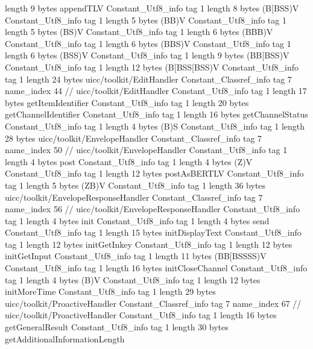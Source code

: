 {{{			length	9
			bytes	appendTLV
		}
		Constant_Utf8_info {
			tag	1
			length	8
			bytes	(B[BSS)V
		}
		Constant_Utf8_info {
			tag	1
			length	5
			bytes	(BB)V
		}
		Constant_Utf8_info {
			tag	1
			length	5
			bytes	(BS)V
		}
		Constant_Utf8_info {
			tag	1
			length	6
			bytes	(BBB)V
		}
		Constant_Utf8_info {
			tag	1
			length	6
			bytes	(BBS)V
		}
		Constant_Utf8_info {
			tag	1
			length	6
			bytes	(BSS)V
		}
		Constant_Utf8_info {
			tag	1
			length	9
			bytes	(BB[BSS)V
		}
		Constant_Utf8_info {
			tag	1
			length	12
			bytes	(B[BSS[BSS)V
		}
		Constant_Utf8_info {
			tag	1
			length	24
			bytes	uicc/toolkit/EditHandler
		}
		Constant_Classref_info {
			tag	7
			name_index	44		// uicc/toolkit/EditHandler
		}
		Constant_Utf8_info {
			tag	1
			length	17
			bytes	getItemIdentifier
		}
		Constant_Utf8_info {
			tag	1
			length	20
			bytes	getChannelIdentifier
		}
		Constant_Utf8_info {
			tag	1
			length	16
			bytes	getChannelStatus
		}
		Constant_Utf8_info {
			tag	1
			length	4
			bytes	(B)S
		}
		Constant_Utf8_info {
			tag	1
			length	28
			bytes	uicc/toolkit/EnvelopeHandler
		}
		Constant_Classref_info {
			tag	7
			name_index	50		// uicc/toolkit/EnvelopeHandler
		}
		Constant_Utf8_info {
			tag	1
			length	4
			bytes	post
		}
		Constant_Utf8_info {
			tag	1
			length	4
			bytes	(Z)V
		}
		Constant_Utf8_info {
			tag	1
			length	12
			bytes	postAsBERTLV
		}
		Constant_Utf8_info {
			tag	1
			length	5
			bytes	(ZB)V
		}
		Constant_Utf8_info {
			tag	1
			length	36
			bytes	uicc/toolkit/EnvelopeResponseHandler
		}
		Constant_Classref_info {
			tag	7
			name_index	56		// uicc/toolkit/EnvelopeResponseHandler
		}
		Constant_Utf8_info {
			tag	1
			length	4
			bytes	init
		}
		Constant_Utf8_info {
			tag	1
			length	4
			bytes	send
		}
		Constant_Utf8_info {
			tag	1
			length	15
			bytes	initDisplayText
		}
		Constant_Utf8_info {
			tag	1
			length	12
			bytes	initGetInkey
		}
		Constant_Utf8_info {
			tag	1
			length	12
			bytes	initGetInput
		}
		Constant_Utf8_info {
			tag	1
			length	11
			bytes	(BB[BSSSS)V
		}
		Constant_Utf8_info {
			tag	1
			length	16
			bytes	initCloseChannel
		}
		Constant_Utf8_info {
			tag	1
			length	4
			bytes	(B)V
		}
		Constant_Utf8_info {
			tag	1
			length	12
			bytes	initMoreTime
		}
		Constant_Utf8_info {
			tag	1
			length	29
			bytes	uicc/toolkit/ProactiveHandler
		}
		Constant_Classref_info {
			tag	7
			name_index	67		// uicc/toolkit/ProactiveHandler
		}
		Constant_Utf8_info {
			tag	1
			length	16
			bytes	getGeneralResult
		}
		Constant_Utf8_info {
			tag	1
			length	30
			bytes	getAdditionalInformationLength
}}}
